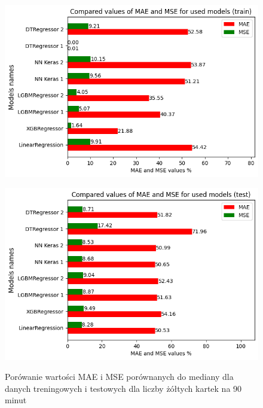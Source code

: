 \documentclass{article}
\begin{document}
\begin{figure}[H]
  \centering
  \begin{minipage}[b]{0.5\textwidth}
    \centering
    \includegraphics[width=\textwidth]{all_errors_3.png}
    \label{fig:all_errors_3}
  \end{minipage}%
  \begin{minipage}[b]{0.5\textwidth}
    \centering
    \includegraphics[width=\textwidth]{all_errors_4.png}
    \label{fig:all_errors_4}
  \end{minipage}
  \captionsetup{justification=centering}
  \caption{Porówanie wartości MAE i MSE porównanych do mediany dla danych treningowych i testowych dla liczby żółtych kartek na 90 minut}
  \label{fig:all_errors_1_2}
\end{figure}
\end{document}
